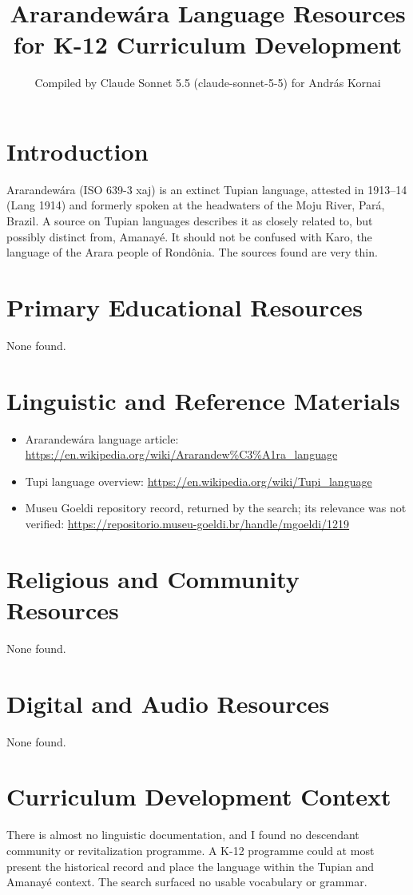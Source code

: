 \documentclass[12pt]{article}
\title{Ararandew\'ara Language Resources for K-12 Curriculum Development}
\author{Compiled by Claude Sonnet 5.5 (claude-sonnet-5-5) for Andr\'as Kornai}
\date{}
\begin{document}
\maketitle

\section{Introduction}
Ararandew\'ara (ISO 639-3 xaj) is an extinct Tupian language, attested in 1913--14 (Lang 1914) and formerly spoken at the headwaters of the Moju River, Par\'a, Brazil. A source on Tupian languages describes it as closely related to, but possibly distinct from, Amanay\'e. It should not be confused with Karo, the language of the Arara people of Rond\^onia. The sources found are very thin.

\section{Primary Educational Resources}
None found.

\section{Linguistic and Reference Materials}
\begin{itemize}
\item Ararandew\'ara language article: \url{https://en.wikipedia.org/wiki/Ararandew%C3%A1ra_language}
\item Tupi language overview: \url{https://en.wikipedia.org/wiki/Tupi_language}
\item Museu Goeldi repository record, returned by the search; its relevance was not verified: \url{https://repositorio.museu-goeldi.br/handle/mgoeldi/1219}
\end{itemize}

\section{Religious and Community Resources}
None found.

\section{Digital and Audio Resources}
None found.

\section{Curriculum Development Context}
There is almost no linguistic documentation, and I found no descendant community or revitalization programme. A K-12 programme could at most present the historical record and place the language within the Tupian and Amanay\'e context. The search surfaced no usable vocabulary or grammar.
\end{document}
